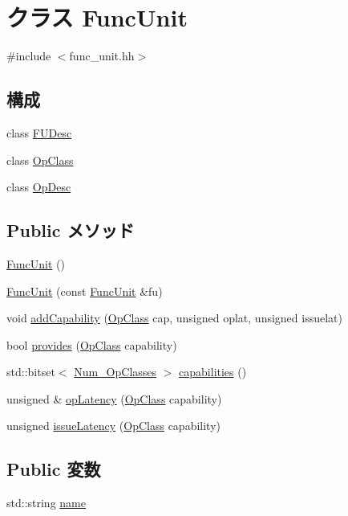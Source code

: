 \hypertarget{classFuncUnit}{
\section{クラス FuncUnit}
\label{classFuncUnit}
}


{\ttfamily \#include $<$func\_\-unit.hh$>$}\subsection*{構成}
\begin{DoxyCompactItemize}
\item 
class \hyperlink{classFuncUnit_1_1FUDesc}{FUDesc}
\item 
class \hyperlink{classFuncUnit_1_1OpClass}{OpClass}
\item 
class \hyperlink{classFuncUnit_1_1OpDesc}{OpDesc}
\end{DoxyCompactItemize}
\subsection*{Public メソッド}
\begin{DoxyCompactItemize}
\item 
\hyperlink{classFuncUnit_acb9265324e00c03e631bb895c2b8750c}{FuncUnit} ()
\item 
\hyperlink{classFuncUnit_aece4c05e748fed50ee88c7c21bf94ab1}{FuncUnit} (const \hyperlink{classFuncUnit}{FuncUnit} \&fu)
\item 
void \hyperlink{classFuncUnit_a458c37aed70ce3c9f1dc77bc7a214bb0}{addCapability} (\hyperlink{classFuncUnit_1_1OpClass}{OpClass} cap, unsigned oplat, unsigned issuelat)
\item 
bool \hyperlink{classFuncUnit_a6d3b2b17239a00dc967226921a945e91}{provides} (\hyperlink{classFuncUnit_1_1OpClass}{OpClass} capability)
\item 
std::bitset$<$ \hyperlink{op__class_8hh_a5e0e351c8afca390ef0a05a7dbb68b1b}{Num\_\-OpClasses} $>$ \hyperlink{classFuncUnit_afd7df91cd73d387e2eea82bc37627a82}{capabilities} ()
\item 
unsigned \& \hyperlink{classFuncUnit_a0e6879ee1a14f16e57a772b29af05533}{opLatency} (\hyperlink{classFuncUnit_1_1OpClass}{OpClass} capability)
\item 
unsigned \hyperlink{classFuncUnit_ae99683f3f3b0a28689755b5ee0c17ee1}{issueLatency} (\hyperlink{classFuncUnit_1_1OpClass}{OpClass} capability)
\end{DoxyCompactItemize}
\subsection*{Public 変数}
\begin{DoxyCompactItemize}
\item 
std::string \hyperlink{classFuncUnit_a9b45b3e13bd9167aab02e17e08916231}{name}
\end{DoxyCompactItemize}
